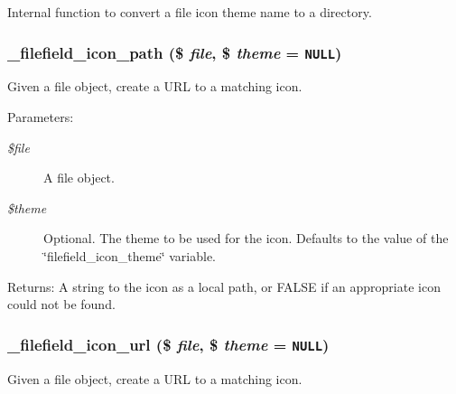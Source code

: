 Internal function to convert a file icon theme name to a directory. \hypertarget{filefield_8theme_8inc_9774c6058393a3ca64f2acd6e882c4f2}{
\subsubsection[{\_\-filefield\_\-icon\_\-path}]{\setlength{\rightskip}{0pt plus 5cm}\_\-filefield\_\-icon\_\-path (\$ {\em file}, \/  \$ {\em theme} = {\tt NULL})}}
\label{filefield_8theme_8inc_9774c6058393a3ca64f2acd6e882c4f2}


Given a file object, create a URL to a matching icon.

\begin{Desc}
\item[Parameters:]
\begin{description}
\item[{\em \$file}]A file object. \item[{\em \$theme}]Optional. The theme to be used for the icon. Defaults to the value of the \char`\"{}filefield\_\-icon\_\-theme\char`\"{} variable. \end{description}
\end{Desc}
\begin{Desc}
\item[Returns:]A string to the icon as a local path, or FALSE if an appropriate icon could not be found. \end{Desc}
\hypertarget{filefield_8theme_8inc_2920d29854bb1b8d0a5fd56ab9d38dbb}{
\subsubsection[{\_\-filefield\_\-icon\_\-url}]{\setlength{\rightskip}{0pt plus 5cm}\_\-filefield\_\-icon\_\-url (\$ {\em file}, \/  \$ {\em theme} = {\tt NULL})}}
\label{filefield_8theme_8inc_2920d29854bb1b8d0a5fd56ab9d38dbb}


Given a file object, create a URL to a matching icon.

